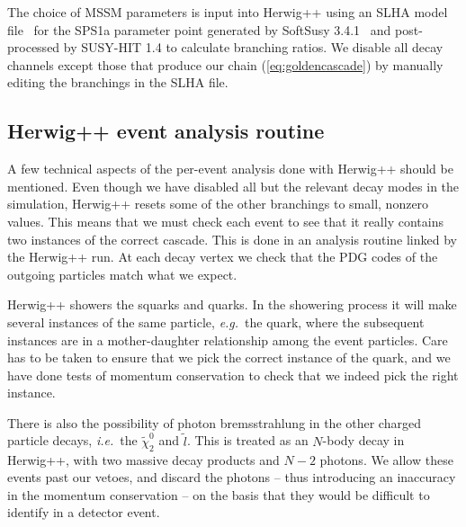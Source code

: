 \documentclass[twoside,english]{uiofysmaster}
\begin{document}
The choice of MSSM parameters is input into {\ttfamily Herwig++} using an SLHA model file~\cite{Skands:2003cj} for the SPS1a parameter point
generated by {\ttfamily SoftSusy 3.4.1}~\cite{Allanach:2001kg} and post-processed by {\ttfamily SUSY-HIT 1.4} \cite{Djouadi:2006bz} to calculate branching ratios. We disable all decay channels except those that produce our chain (\ref{eq:goldencascade}) by manually editing the branchings in the SLHA file. 

\subsection{Herwig++ event analysis routine} 

A few technical aspects of the per-event analysis done with {\ttfamily Herwig++} should be mentioned. Even though we have disabled all but the relevant decay modes in the simulation, {\ttfamily Herwig++} resets some of the other branchings to small, nonzero values. This means that we must check each event to see that it really contains two instances of the correct cascade. This is done in an analysis routine linked by the {\ttfamily Herwig++} run. At each decay vertex we check that the PDG codes of the outgoing particles match what we expect.

{\ttfamily Herwig++} showers the squarks and quarks. In the showering process it will make several instances of the same particle, {\it e.g.}\ the quark, where the subsequent instances are in a mother-daughter relationship among the event particles. Care has to be taken to ensure that we pick the correct instance of the quark, and we have done tests of momentum conservation to check that we indeed pick the right instance.

There is also the possibility of photon bremsstrahlung in the other charged particle decays, {\it i.e.}\ the $\tilde \chi_2^0$ and $\tilde l$. This is treated as an $N$-body decay in {\ttfamily Herwig++}, with two massive decay products and $N-2$ photons. We allow these events past our vetoes, and discard the photons -- thus introducing an inaccuracy in the momentum conservation -- on the basis that they would be difficult to identify in a detector event. 


\end{document}
